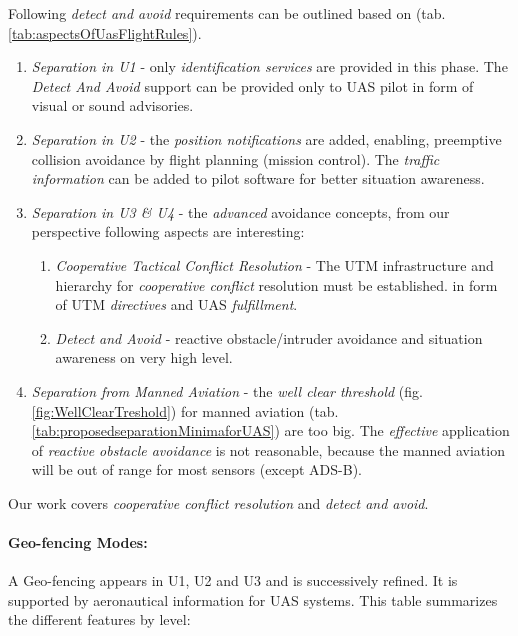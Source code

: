 \noindent Following \emph{detect and avoid} requirements can be outlined based on (tab. \ref{tab:aspectsOfUasFlightRules}).
\begin{enumerate}
    \item \emph{Separation in U1} - only \emph{identification services} are provided in this phase. The \emph{Detect And Avoid} support can be provided only to UAS pilot in form of visual or sound advisories. 
    
    \item \emph{Separation in U2} - the \emph{position notifications} are added, enabling, preemptive collision avoidance by flight planning (mission control). The \emph{traffic information} can be added to pilot software for better situation awareness.  


    \item \emph{Separation in U3 \& U4} - the \emph{advanced} avoidance concepts, from our perspective following aspects are interesting: 
    \begin{enumerate}[a]
        \item \emph{Cooperative Tactical Conflict Resolution} - The UTM infrastructure and hierarchy for \emph{cooperative conflict} resolution must be established. in form of UTM \emph{directives} and UAS \emph{fulfillment}.
        
        \item \emph{Detect and Avoid} - reactive obstacle/intruder avoidance and situation awareness on very high level.
    \end{enumerate}
    
    \item \emph{Separation from Manned Aviation} - the \emph{well clear threshold} (fig. \ref{fig:WellClearTreshold}) for manned aviation  (tab.\ref{tab:proposedseparationMinimaforUAS}) are too big. The \emph{effective} application of \emph{reactive obstacle avoidance} is not reasonable, because the manned aviation will be out of range for most sensors (except ADS-B).
\end{enumerate}

\begin{note}
    Our work covers \emph{cooperative conflict resolution} and \emph{detect and avoid}.
\end{note}

\paragraph{Geo-fencing Modes:} A Geo-fencing appears in U1, U2 and U3 and is successively refined. It is supported by aeronautical information for UAS systems. This table summarizes the different features by level:

